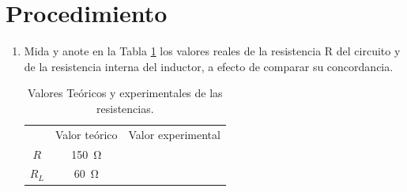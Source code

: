 \documentclass[12pt,letterpaper]{report}
\newcommand{\pro}{Procedimiento}
\begin{document}
\section{\pro}
\begin{enumerate}
\item Mida y anote en la Tabla \ref{tab:L12T1} los valores reales de la resistencia R del circuito y de la resistencia interna del inductor, a efecto de comparar su concordancia.

\begin{table}[H]
	\caption{Valores Teóricos y experimentales de las resistencias.}
	\label{tab:L12T1}
	\centering
	\begin{tabular}[h]{|c|c|c|}
		\cline{2-3}
		\multicolumn{1}{c|}{} &
		\multicolumn{1}{c|}{Valor teórico} &
		\multicolumn{1}{c|}{Valor experimental} \\
		
		$R$ & \SI{150}{\ohm} & {} \\
		
		$R_L$ & \SI{60}{\ohm} & {} \\
		

\end{tabular}
\end{table}
\end{enumerate}
\end{document}
